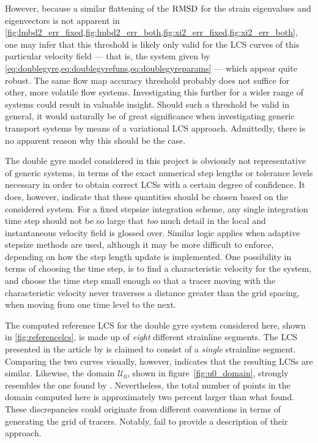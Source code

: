 However, because a similar flattening of the $\operatorname{RMSD}$ for the strain eigenvalues
and eigenvectors is not apparent in
\cref{fig:lmbd2_err_fixed,fig:lmbd2_err_both,fig:xi2_err_fixed,fig:xi2_err_both},
one may infer that this threshold is likely only valid for the LCS curves
of this particular velocity field --- that is, the system given by
\cref{eq:doublegyre,eq:doublegyrefuns,eq:doublegyreparams} %
--- which
appear quite robust. The same flow map accuracy threshold probably does not
suffice for other, more volatile flow systems. Investigating
this further for a wider range of systems could result in valuable insight.
Should such a threshold be valid in general, it would naturally be of great
significance when investigating generic transport systems by means of a
variational LCS approach. Admittedly, there is no apparent reason why
this should be the case.

The double gyre model considered in this project is obviously not representative
of generic systems, in terms of the exact numerical step lengths or tolerance
levels necessary in order to obtain correct LCSs with a certain
degree of confidence. It does, however, indicate that these quantities should
be chosen based on the considered system. For a fixed stepsize integration
scheme, any single integration time step should not be so large that \emph{too}
much detail in the local and instantaneous velocity field is glossed over.
Similar logic applies when adaptive stepsize methods are used, although it
may be more difficult to enforce, depending on how the step length
update is implemented. One possibility in terms of choosing the time step, is to
find a characteristic velocity for the system, and choose the time step small
enough so that a tracer moving with the characteristic velocity never traverses
a distance greater than the grid spacing, when moving from one time level to
the next.

The computed reference LCS for the double gyre system considered here, shown in
\cref{fig:referencelcs}, is made up of \emph{eight} different strainline
segments. The LCS presented in the article by \textcite{farazmand2012computing}
is claimed to consist of a \emph{single} strainline segment. Comparing the two
curves visually, however, indicates that the resulting LCSs are similar.
Likewise, the domain $\mathcal{U}_{0}$, shown in figure~\ref{fig:u0_domain},
strongly resembles the one found by \citeauthor{farazmand2012computing}.
Nevertheless, the total number of points in the domain computed here is
approximately two percent larger than what \citeauthor{farazmand2012computing}
found. These discrepancies could originate from different conventions in terms
of generating the grid of tracers. Notably, \citeauthor{farazmand2012computing}
fail to provide a description of their approach.

